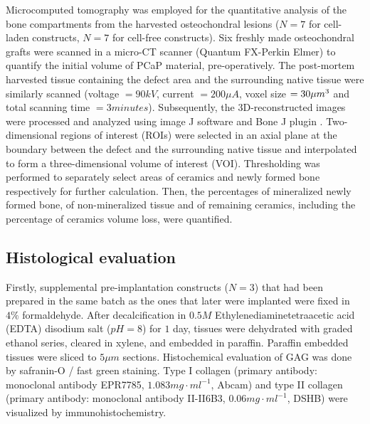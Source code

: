 \documentclass[twocolumn, empirical, authordate, issue]{jote-new-article}
\begin{document}
Microcomputed tomography was employed for the quantitative analysis of the bone compartments from the harvested osteochondral lesions ($ N=7 $ for cell-laden constructs, $ N=7 $ for cell-free constructs). Six freshly made osteochondral grafts were scanned in a micro-CT scanner (Quantum FX-Perkin Elmer) to quantify the initial volume of PCaP material, pre-operatively. The post-mortem harvested tissue containing the defect area and the surrounding native tissue were similarly scanned (voltage $= 90 kV$, current $= 200 \mu A$, voxel size $= 30 \mu m\textsuperscript{3}$ and total scanning time $= 3 minutes$). Subsequently, the 3D-reconstructed images were processed and analyzed using image J software \parencite{Schindelin2012} and Bone J plugin \parencite{Doube2010}. Two-dimensional regions of interest (ROIs) were selected in an axial plane at the boundary between the defect and the surrounding native tissue and interpolated to form a three-dimensional volume of interest (VOI). Thresholding was performed to separately select areas of ceramics and newly formed bone respectively for further calculation. Then, the percentages of mineralized newly formed bone, of non-mineralized tissue and of remaining ceramics, including the percentage of ceramics volume loss, were quantified.

\subsection{Histological evaluation} 

Firstly, supplemental pre-implantation constructs ($N=3$) that had been prepared in the same batch as the ones that later were implanted were fixed in $4\%$ formaldehyde. After decalcification in $0.5M$ Ethylenediaminetetraacetic acid (EDTA) disodium salt ($pH = 8$) for $1$ day, tissues were dehydrated with graded ethanol series, cleared in xylene, and embedded in paraffin. Paraffin embedded tissues were sliced to $5 \mu m$ sections. Histochemical evaluation of GAG was done by safranin-O / fast green staining. Type I collagen (primary antibody: monoclonal antibody EPR7785, $1.083 mg\cdot ml^{-1}$, Abcam) and type II collagen (primary antibody: monoclonal antibody II-II6B3, $0.06 mg\cdot ml^{-1}$, DSHB) were visualized by immunohistochemistry.
\end{document}
